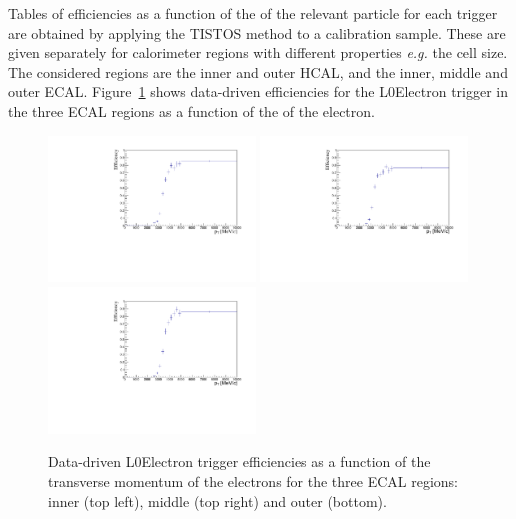 Tables of efficiencies as a function of the \pt of the relevant particle for each trigger 
are obtained by applying the TISTOS method to a calibration sample.
These are given separately for calorimeter regions with different properties \emph{e.g.} the cell size.
The considered regions are the inner and outer HCAL, 
and the inner, middle and outer ECAL. Figure~\ref{sec:L0eff_tables} shows data-driven 
efficiencies for the L0Electron trigger in the three ECAL regions as a function of the \pt of the electron.
%
\begin{figure}[h!]
\centering
\includegraphics[width=0.49\textwidth]{RKst/figs/l0plots/l0E_Inner.pdf}
\includegraphics[width=0.49\textwidth]{RKst/figs/l0plots/l0E_Middle.pdf}
\includegraphics[width=0.49\textwidth]{RKst/figs/l0plots/l0E_Outer.pdf}
\caption{Data-driven L0Electron trigger efficiencies as a function of the transverse momentum
of the electrons for the three ECAL regions: inner (top left), middle (top right) and outer (bottom).}
\label{sec:L0eff_tables}
\end{figure}

